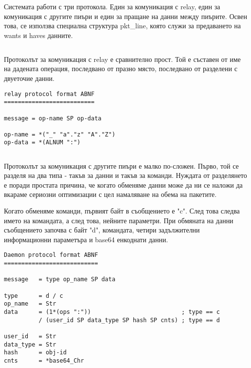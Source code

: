 \documentclass[a4paper,12pt]{article}
\begin{document}
Системата работи с три протокола. Един за комуникация с relay, един за комуникация
с другите пиъри и един за пращане на данни между пиърите. Освен това, се използва
специална структура pkt\_line, която служи за предаването на wants и haves данните.

\subsection{}

Протоколът за комуникация с relay е сравнително прост. Той е съставен от име на
дадената операция, последвано от празно място, последвано от разделени с двуеточие
данни.

\begin{verbatim}
relay protocol format ABNF
==========================

message = op-name SP op-data

op-name = *("_" "a"."z" "A"."Z")
op-data = *(ALNUM ":")
\end{verbatim}

\subsection{}

Протоколът за комуникация с другите пиъри е малко по-сложен. Първо, той се
разделя на два типа - такъв за данни и такъв за команди. Нуждата от разделянето
е поради простата причина, че когато обменяме данни може да ни се наложи да
вкараме сериозни оптимизации с цел намаляване на обема на пакетите.

Когато обменяме команди, първият байт в съобщението е "c". След това следва името
на командата, а след това, нейните параметри. При обмяната на данни съобщението
започва с байт "d", командата, четири задължителни информационни параметъра
и base64 енкоднати данни.

\begin{verbatim}
Daemon protocol format ABNF
===========================

message   = type op_name SP data

type      = d / c
op_name   = Str
data      = (1*(ops ":"))                          ; type == c
          / (user_id SP data_type SP hash SP cnts) ; type == d

user_id   = Str
data_type = Str
hash      = obj-id
cnts      = *base64_Chr
\end{verbatim}

\subsection{}
\end{document}
